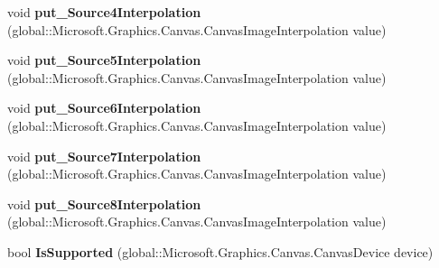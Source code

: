 \begin{DoxyCompactItemize}
\item 
\mbox{\label{class_microsoft_1_1_graphics_1_1_canvas_1_1_effects_1_1_pixel_shader_effect_aa8738daadd97a011f9b766ecffe459f7}} 
void {\bfseries put\+\_\+\+Source4\+Interpolation} (global\+::\+Microsoft.\+Graphics.\+Canvas.\+Canvas\+Image\+Interpolation value)
\item 
\mbox{\label{class_microsoft_1_1_graphics_1_1_canvas_1_1_effects_1_1_pixel_shader_effect_a0f26ca4078761bac099a4534ca5b6a4c}} 
void {\bfseries put\+\_\+\+Source5\+Interpolation} (global\+::\+Microsoft.\+Graphics.\+Canvas.\+Canvas\+Image\+Interpolation value)
\item 
\mbox{\label{class_microsoft_1_1_graphics_1_1_canvas_1_1_effects_1_1_pixel_shader_effect_a5a6a690fb4d372eb70e6f0115ee5d307}} 
void {\bfseries put\+\_\+\+Source6\+Interpolation} (global\+::\+Microsoft.\+Graphics.\+Canvas.\+Canvas\+Image\+Interpolation value)
\item 
\mbox{\label{class_microsoft_1_1_graphics_1_1_canvas_1_1_effects_1_1_pixel_shader_effect_ac402bf5cd375703e0bc1bc2e2056c703}} 
void {\bfseries put\+\_\+\+Source7\+Interpolation} (global\+::\+Microsoft.\+Graphics.\+Canvas.\+Canvas\+Image\+Interpolation value)
\item 
\mbox{\label{class_microsoft_1_1_graphics_1_1_canvas_1_1_effects_1_1_pixel_shader_effect_aae60f5dc09959a06e871498047c63e6f}} 
void {\bfseries put\+\_\+\+Source8\+Interpolation} (global\+::\+Microsoft.\+Graphics.\+Canvas.\+Canvas\+Image\+Interpolation value)
\item 
\mbox{\label{class_microsoft_1_1_graphics_1_1_canvas_1_1_effects_1_1_pixel_shader_effect_a07d13495b36e9cf0b7e4d15e023a3856}} 
bool {\bfseries Is\+Supported} (global\+::\+Microsoft.\+Graphics.\+Canvas.\+Canvas\+Device device)
\item 
\mbox{\label{class_microsoft_1_1_graphics_1_1_canvas_1_1_effects_1_1_pixel_shader_effect_aac4d2de71b564713a4c2ad43a744deec}} 

\end{DoxyCompactItemize}
